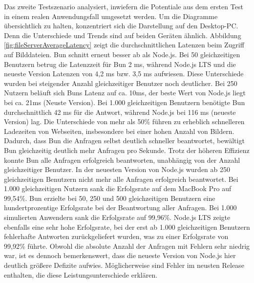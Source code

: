 \noindent
Das zweite Testszenario analysiert, inwiefern die Potentiale aus dem ersten Test in einem realen Anwendungsfall umgesetzt werden. Um die Diagramme übersichtlich zu halten, konzentriert sich die Darstellung auf den Desktop-PC. Denn die Unterschiede und Trends sind auf beiden Geräten ähnlich. Abbildung \ref{fig:fileServerAverageLatency} zeigt die durchschnittlichen Latenzen beim Zugriff auf Bilddateien. Bun schnitt erneut besser ab als Node.js. Bei 50 gleichzeitigen Benutzern betrug die Latenzzeit für Bun 2 ms, während Node.js LTS und die neueste Version Latenzen von 4,2 ms bzw. 3,5 ms aufwiesen. Diese Unterschiede wurden bei steigender Anzahl gleichzeitiger Benutzer noch deutlicher. Bei 250 Nutzern beläuft sich Buns Latenz auf ca. 10ms, der beste Wert von Node.js liegt bei ca. 21ms (Neuste Version). Bei 1.000 gleichzeitigen Benutzern benötigte Bun durchschnittlich 42 ms für die Antwort, während Node.js bei 116 ms (neueste Version) lag. Die Unterschiede von mehr als 50\% führen zu erheblich schnelleren Ladezeiten von Webseiten, insbesondere bei einer hohen Anzahl von Bildern. Dadurch, dass Bun die Anfragen selbst deutlich schneller beantwortet, bewältigt Bun gleichzeitig deutlich mehr Anfragen pro Sekunde. Trotz der höheren Effizienz konnte Bun alle Anfragen erfolgreich beantworten, unabhängig von der Anzahl gleichzeitiger Benutzer. In der neuesten Version von Node.js wurden ab 250 gleichzeitigen Benutzern nicht mehr alle Anfragen erfolgreich beantwortet. Bei 1.000 gleichzeitigen Nutzern sank die Erfolgsrate auf dem MacBook Pro auf 99,54\%. Bun erzielte bei 50, 250 und 500 gleichzeitigen Benutzern eine hundertprozentige Erfolgsrate bei der Beantwortung aller Anfragen. Bei 1.000 simulierten Anwendern sank die Erfolgsrate auf 99,96\%. Node.js LTS zeigte ebenfalls eine sehr hohe Erfolgsrate, bei der erst ab 1.000 gleichzeitigen Benutzern fehlerhafte Antworten zurückgeliefert wurden, was zu einer Erfolgsrate von 99,92\% führte. Obwohl die absolute Anzahl der Anfragen mit Fehlern sehr niedrig war, ist es dennoch bemerkenswert, dass die neueste Version von Node.js hier deutlich größere Defizite aufwies. Möglicherweise sind Fehler im neusten Release enthalten, die diese Leistungsunterschiede erklären.\\

